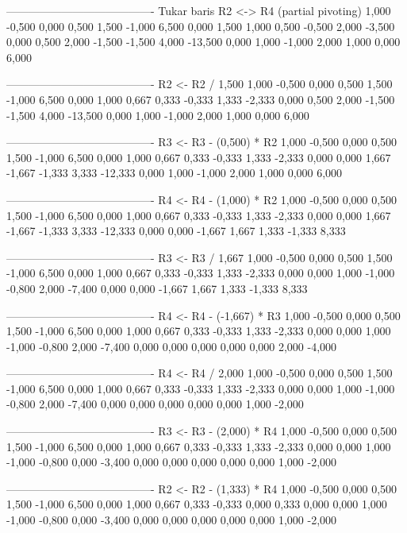 \documentclass[12pt]{article}
\begin{document}
\begin{enumerate}
\begin{keluaran}
----------------------------------------
Tukar baris R2 <-> R4 (partial pivoting)
1,000   -0,500  0,000   0,500   1,500   -1,000  6,500
0,000   1,500   1,000   0,500   -0,500  2,000   -3,500
0,000   0,500   2,000   -1,500  -1,500  4,000   -13,500
0,000   1,000   -1,000  2,000   1,000   0,000   6,000

----------------------------------------
R2 <- R2 / 1,500
1,000   -0,500  0,000   0,500   1,500   -1,000  6,500
0,000   1,000   0,667   0,333   -0,333  1,333   -2,333
0,000   0,500   2,000   -1,500  -1,500  4,000   -13,500
0,000   1,000   -1,000  2,000   1,000   0,000   6,000

----------------------------------------
R3 <- R3 - (0,500) * R2
1,000   -0,500  0,000   0,500   1,500   -1,000  6,500
0,000   1,000   0,667   0,333   -0,333  1,333   -2,333
0,000   0,000   1,667   -1,667  -1,333  3,333   -12,333
0,000   1,000   -1,000  2,000   1,000   0,000   6,000

----------------------------------------
R4 <- R4 - (1,000) * R2
1,000   -0,500  0,000   0,500   1,500   -1,000  6,500
0,000   1,000   0,667   0,333   -0,333  1,333   -2,333
0,000   0,000   1,667   -1,667  -1,333  3,333   -12,333
0,000   0,000   -1,667  1,667   1,333   -1,333  8,333

----------------------------------------
R3 <- R3 / 1,667
1,000   -0,500  0,000   0,500   1,500   -1,000  6,500
0,000   1,000   0,667   0,333   -0,333  1,333   -2,333
0,000   0,000   1,000   -1,000  -0,800  2,000   -7,400
0,000   0,000   -1,667  1,667   1,333   -1,333  8,333

----------------------------------------
R4 <- R4 - (-1,667) * R3
1,000   -0,500  0,000   0,500   1,500   -1,000  6,500
0,000   1,000   0,667   0,333   -0,333  1,333   -2,333
0,000   0,000   1,000   -1,000  -0,800  2,000   -7,400
0,000   0,000   0,000   0,000   0,000   2,000   -4,000

----------------------------------------
R4 <- R4 / 2,000
1,000   -0,500  0,000   0,500   1,500   -1,000  6,500
0,000   1,000   0,667   0,333   -0,333  1,333   -2,333
0,000   0,000   1,000   -1,000  -0,800  2,000   -7,400
0,000   0,000   0,000   0,000   0,000   1,000   -2,000

----------------------------------------
R3 <- R3 - (2,000) * R4
1,000   -0,500  0,000   0,500   1,500   -1,000  6,500
0,000   1,000   0,667   0,333   -0,333  1,333   -2,333
0,000   0,000   1,000   -1,000  -0,800  0,000   -3,400
0,000   0,000   0,000   0,000   0,000   1,000   -2,000

----------------------------------------
R2 <- R2 - (1,333) * R4
1,000   -0,500  0,000   0,500   1,500   -1,000  6,500
0,000   1,000   0,667   0,333   -0,333  0,000   0,333
0,000   0,000   1,000   -1,000  -0,800  0,000   -3,400
0,000   0,000   0,000   0,000   0,000   1,000   -2,000


\end{keluaran}
\end{enumerate}
\end{document}
